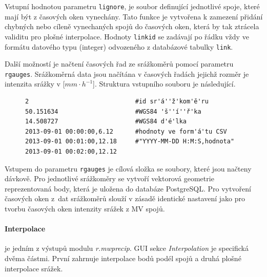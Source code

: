 \documentclass[a4paper,12pt,oneside]{report}
\begin{document}
Vstupní hodnotou parametru \texttt{lignore}, je soubor definující
jednotlivé spoje, které mají být z časových oken vynechány. Tato
funkce je vytvořena k zamezení přidání chybných nebo cíleně
vynechaných spojů do časových oken, která by tak ztrácela validitu pro
plošné interpolace. Hodnoty \texttt{linkid} se zadávají po řádku vždy
ve formátu datového typu (integer) odvozeného z databázové tabulky
\texttt{link}.

Další možností je načtení časových řad ze srážkoměrů pomocí parametru
\texttt{rgauges}. Srážkoměrná data jsou načítána v časových řadách jejichž rozměr je intenzita srážky v [$mm \cdot h^{-1}$]. Struktura vstupního
souboru je následující.


\begin{figure}[h!]
\begin{footnotesize}
\lstset{extendedchars=false,
escapeinside=''}
\begin{lstlisting}[style=mybash]
2                             #id sr'á''ž'kom'ě'ru			
50.151634                     #WGS84 'š''í''ř'ka				
14.508727                     #WGS84 d'é'lka	
2013-09-01 00:00:00,6.12      #hodnoty ve form'á'tu CSV 
2013-09-01 00:01:00,12.18     #"YYYY-MM-DD H:M:S,hodnota"		
2013-09-01 00:02:00,12.12
\end{lstlisting}
\end{footnotesize}
\end{figure}


Vstupem do parametru \texttt{rgauges} je cílová složka se soubory,
které jsou načteny dávkově. Pro jednotlivé srážkoměry se vytvoří
vektorová geometrie reprezentovaná body, která je uložena do databáze
PostgreSQL. Pro vytvoření časových oken z~dat srážkoměrů slouží 
v zásadě identické nastavení jako pro tvorbu časových oken 
intenzity srážek z MV spojů.


\paragraph*{Interpolace} je jedním z výstupů modulu
\textit{r.mwprecip}. GUI sekce \textit{Interpolation} je specifická
dvěma částmi. První zahrnuje interpolace bodů podél spojů a druhá
plošné interpolace srážek.
\end{document}
